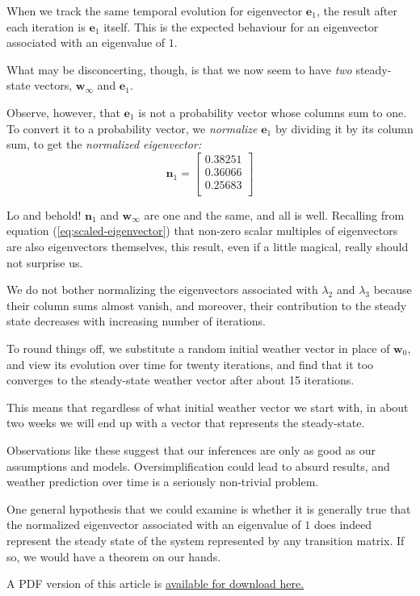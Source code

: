 \documentclass[
  12pt,
  a4paper,
]{article}
\begin{document}
When we track the same temporal evolution for eigenvector
\(\boldsymbol{e}_{1}\), the result after each iteration is
\(\boldsymbol{e}_{1}\) itself. This is the expected behaviour for an
eigenvector associated with an eigenvalue of \(1\).

What may be disconcerting, though, is that we now seem to have
\emph{two} steady-state vectors, \(\boldsymbol{w}_{\infty}\) and
\(\boldsymbol{e}_{1}\).

Observe, however, that \(\boldsymbol{e}_{1}\) is not a probability
vector whose columns sum to one. To convert it to a probability vector,
we \emph{normalize} \(\boldsymbol{e}_{1}\) by dividing it by its column
sum, to get the \emph{normalized eigenvector:} \begin{equation}
\boldsymbol{n}_{1} = \begin{bmatrix}
0.38251\\
0.36066\\
0.25683\\
\end{bmatrix}
\label{eq:normalized-eigenvector-1}\end{equation}

Lo and behold! \(\boldsymbol{n}_{1}\) and \(\boldsymbol{w}_{\infty}\)
are one and the same, and all is well. Recalling from equation
(\ref{eq:scaled-eigenvector}) that non-zero scalar multiples of
eigenvectors are also eigenvectors themselves, this result, even if a
little magical, really should not surprise us.

We do not bother normalizing the eigenvectors associated with
\(\lambda_{2}\) and \(\lambda_{3}\) because their column sums almost
vanish, and moreover, their contribution to the steady state decreases
with increasing number of iterations.

To round things off, we substitute a random initial weather vector in
place of \(\boldsymbol{w}_{0}\), and view its evolution over time for
twenty iterations, and find that it too converges to the steady-state
weather vector after about 15 iterations.

This means that regardless of what initial weather vector we start with,
in about two weeks we will end up with a vector that represents the
steady-state.

Observations like these suggest that our inferences are only as good as
our assumptions and models. Oversimplification could lead to absurd
results, and weather prediction over time is a seriously non-trivial
problem.

One general hypothesis that we could examine is whether it is generally
true that the normalized eigenvector associated with an eigenvalue of
\(1\) does indeed represent the steady state of the system represented
by any transition matrix. If so, we would have a theorem on our hands.

A PDF version of this article is
\href{http://swanlotus.org/wp-content/uploads/eigen.pdf}{available for
download here.}
\end{document}
